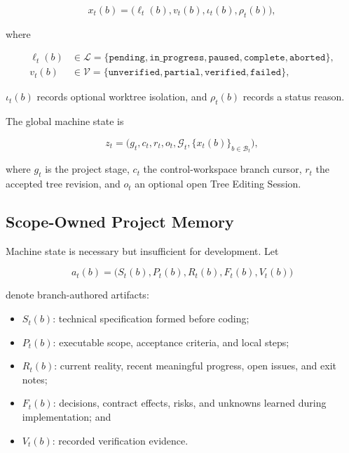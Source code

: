 \documentclass[11pt]{article}
\newcommand{\B}{\mathcal{B}}
\newcommand{\G}{\mathcal{G}}
\newcommand{\Lset}{\mathcal{L}}
\newcommand{\Vset}{\mathcal{V}}
\theoremstyle{definition}
\begin{document}
\begin{equation}
  x_t(b)=
  \bigl(
    \ell_t(b),
    v_t(b),
    \iota_t(b),
    \rho_t(b)
  \bigr),
  \label{eq:branch-state}
\end{equation}

where

\begin{align}
  \ell_t(b) &\in
  \Lset=
  \{\texttt{pending},\texttt{in\_progress},\texttt{paused},
    \texttt{complete},\texttt{aborted}\},\\
  v_t(b) &\in
  \Vset=
  \{\texttt{unverified},\texttt{partial},
    \texttt{verified},\texttt{failed}\},
\end{align}

$\iota_t(b)$ records optional worktree isolation, and $\rho_t(b)$ records a
status reason.

The global machine state is

\begin{equation}
  z_t =
  \bigl(
    g_t,c_t,r_t,o_t,\G_t,\{x_t(b)\}_{b\in\B_t}
  \bigr),
  \label{eq:global-state}
\end{equation}

where $g_t$ is the project stage, $c_t$ the control-workspace branch cursor,
$r_t$ the accepted tree revision, and $o_t$ an optional open Tree Editing
Session.

\subsection{Scope-Owned Project Memory}

Machine state is necessary but insufficient for development.  Let

\begin{equation}
  a_t(b)=
  \bigl(
    S_t(b),P_t(b),R_t(b),F_t(b),V_t(b)
  \bigr)
  \label{eq:branch-artifacts}
\end{equation}

denote branch-authored artifacts:

\begin{itemize}
  \item $S_t(b)$: technical specification formed before coding;
  \item $P_t(b)$: executable scope, acceptance criteria, and local steps;
  \item $R_t(b)$: current reality, recent meaningful progress, open issues, and
        exit notes;
  \item $F_t(b)$: decisions, contract effects, risks, and unknowns learned
        during implementation; and
  \item $V_t(b)$: recorded verification evidence.
\end{itemize}
\end{document}
